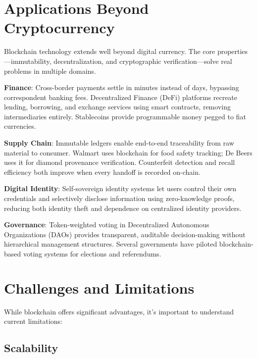 \section{Applications Beyond Cryptocurrency}
\label{sec:applications}

Blockchain technology extends well beyond digital currency. The core properties---immutability, decentralization, and cryptographic verification---solve real problems in multiple domains.

\textbf{Finance}: Cross-border payments settle in minutes instead of days, bypassing correspondent banking fees. Decentralized Finance (DeFi) platforms recreate lending, borrowing, and exchange services using smart contracts, removing intermediaries entirely. Stablecoins provide programmable money pegged to fiat currencies.

\textbf{Supply Chain}: Immutable ledgers enable end-to-end traceability from raw material to consumer. Walmart uses blockchain for food safety tracking; De Beers uses it for diamond provenance verification. Counterfeit detection and recall efficiency both improve when every handoff is recorded on-chain.

\textbf{Digital Identity}: Self-sovereign identity systems let users control their own credentials and selectively disclose information using zero-knowledge proofs, reducing both identity theft and dependence on centralized identity providers.

\textbf{Governance}: Token-weighted voting in Decentralized Autonomous Organizations (DAOs) provides transparent, auditable decision-making without hierarchical management structures. Several governments have piloted blockchain-based voting systems for elections and referendums.

\section{Challenges and Limitations}
\label{sec:challenges-limitations}

While blockchain offers significant advantages, it's important to understand current limitations:

\subsection{Scalability}
\label{subsec:scalability}

